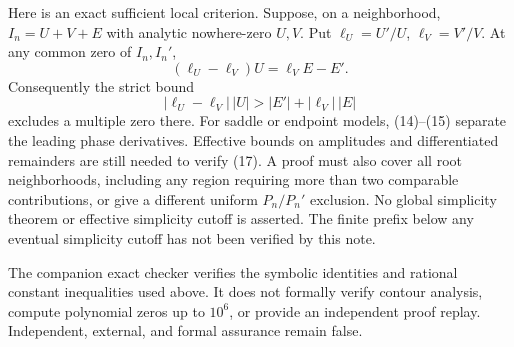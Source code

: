 \documentclass[11pt]{article}
\begin{document}
Here is an exact sufficient local criterion. Suppose, on a neighborhood,
$I_n=U+V+E$ with analytic nowhere-zero $U,V$. Put
$\ell_U=U'/U$, $\ell_V=V'/V$. At any common zero of $I_n,I_n'$,
\[
             (\ell_U-\ell_V)U=\ell_V E-E'.            \tag{16}
\]
Consequently the strict bound
\[
 |\ell_U-\ell_V|\,|U|>|E'|+|\ell_V|\,|E|             \tag{17}
\]
excludes a multiple zero there. For saddle or endpoint models,
(14)--(15) separate the leading phase derivatives. Effective bounds on
amplitudes and differentiated remainders are still needed to verify (17).
A proof must also cover all root neighborhoods, including any region
requiring more than two comparable contributions, or give a different
uniform $P_n/P_n'$ exclusion. No global simplicity theorem or effective
simplicity cutoff is asserted. The finite prefix below any eventual
simplicity cutoff has not been verified by this note.

The companion exact checker verifies the symbolic identities and rational
constant inequalities used above. It does not formally verify contour
analysis, compute polynomial zeros up to $10^6$, or provide an independent
proof replay. Independent, external, and formal assurance remain false.
\end{document}
